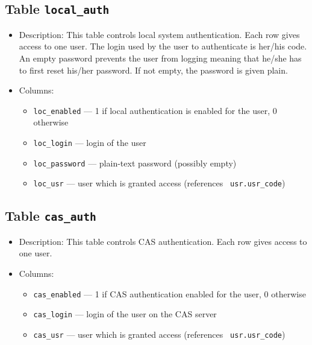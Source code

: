 \subsection{Table \texttt{local\_auth}}
\begin{itemize}[itemsep=0pt,parsep=0pt,topsep=0pt,partopsep=0pt]
\item Description: This table controls local system
           authentication. Each row gives access to one user. The
           login used by the user to authenticate is her/his code. An
           empty password prevents the user from logging meaning that
           he/she has to first reset his/her password. If not empty,
           the password is given plain.
\item Columns:
\begin{itemize}[itemsep=0pt,parsep=0pt,topsep=0pt,partopsep=0pt]
\item\texttt{loc\_enabled} --- 1 if local authentication is enabled for the
               user, 0 otherwise
\item\texttt{loc\_login} --- login of the user
\item\texttt{loc\_password} --- plain-text password (possibly empty)
\item\texttt{loc\_usr} --- user which is granted access (references {\tt
               usr.usr\_code})
\end{itemize}
\end{itemize}
\subsection{Table \texttt{cas\_auth}}
\begin{itemize}[itemsep=0pt,parsep=0pt,topsep=0pt,partopsep=0pt]
\item Description: This table controls CAS authentication. Each row
           gives access to one user.
\item Columns:
\begin{itemize}[itemsep=0pt,parsep=0pt,topsep=0pt,partopsep=0pt]
\item\texttt{cas\_enabled} --- 1 if CAS authentication enabled for the user, 0 otherwise
\item\texttt{cas\_login} --- login of the user on the CAS server
\item\texttt{cas\_usr} --- user which is granted access (references {\tt
               usr.usr\_code})
\end{itemize}
\end{itemize}
